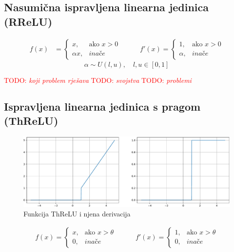 \documentclass[times, utf8, numeric, diplomski]{fer}
\def\otherwise{\textit{inače}}
\def\TODO#1{\noindent\textcolor{red}{TODO: \textit{#1}}\newline}
\def\todo#1{\TODO{#1}}
\def\todoimg#1{\begin{center} \textcolor{red}{\big[ IMAGE: \textit{#1} \big]} \end{center}}
\begin{document}
\subsection{Nasumična ispravljena linearna jedinica (RReLU)}

\todoimg{}

\begin{equation}
\begin{split}
f(x) &= 
\begin{cases}
x,			& \text{ako } x > 0 \\
\alpha x,	& \otherwise
\end{cases}
\end{split}
\qquad
\begin{split}
f'(x) = 
\begin{cases}
1,		& \text{ako } x > 0 \\
\alpha,	& \otherwise
\end{cases}
\end{split}
\end{equation}
\begin{equation}
\alpha \sim U(l,u),\quad l,u \in [0,1]
\end{equation}

\todo{koji problem rješava}
\todo{svojstva}
\todo{problemi}
\fi %

\subsection{Ispravljena linearna jedinica s pragom (ThReLU)}

\begin{figure}[H]
\includegraphics[width=\textwidth]{func_ThReLU.pdf}
\centering
\caption{Funkcija ThReLU i njena derivacija}
\label{fig:threlu}
\end{figure}

\begin{equation}
\label{eq:threlu}
\begin{split}
f(x) = 
\begin{cases}
x,		& \text{ako } x > \theta \\
0,		& \otherwise
\end{cases}
\end{split}
\qquad
\begin{split}
f'(x) = 
\begin{cases}
1,		& \text{ako } x > \theta \\
0,		& \otherwise
\end{cases}
\end{split}
\end{equation}
\end{document}

